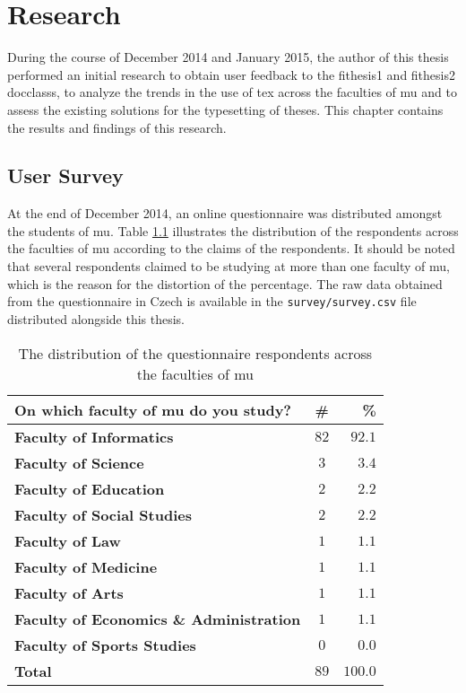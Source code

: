 \chapter{Research}
During the course of December 2014 and January 2015, the author of this thesis performed an initial research to obtain user feedback to the fithesis1 and fithesis2 \glspl{docclass}, to analyze the trends in the use of \gls{tex} across the faculties of \gls{mu} and to assess the existing solutions for the typesetting of theses. This chapter contains the results and findings of this research.

  \section{User Survey}
  At the end of December 2014, an online questionnaire was distributed amongst the students of \gls{mu}. Table \ref{table:survey-faculty} illustrates the distribution of the respondents across the faculties of \gls{mu} according to the claims of the respondents. It should be noted that several respondents claimed to be studying at more than one faculty of \gls{mu}, which is the reason for the distortion of the percentage. The raw data obtained from the questionnaire in Czech is available in the \texttt{survey/survey.csv} file distributed alongside this thesis.

  \begin{table}
    \caption{The distribution of the questionnaire respondents across the faculties of \acrshort{mu}}
    \begin{tabularx}{\textwidth}{Xcr}
      \textbf{On which faculty of \gls{mu} do you study?} & \textbf{\#} & \textbf{\%} \\
      \hline
      \textbf{Faculty of Informatics}                  & $82$          & $92.1$ \\
      \textbf{Faculty of Science}                      &  $3$          &  $3.4$ \\
      \textbf{Faculty of Education}                    &  $2$          &  $2.2$ \\
      \textbf{Faculty of Social Studies}               &  $2$          &  $2.2$ \\
      \textbf{Faculty of Law}                          &  $1$          &  $1.1$ \\
      \textbf{Faculty of Medicine}                     &  $1$          &  $1.1$ \\
      \textbf{Faculty of Arts}                         &  $1$          &  $1.1$ \\
      \textbf{Faculty of Economics \& Administration}  &  $1$          &  $1.1$ \\
      \textbf{Faculty of Sports Studies}               &  $0$          &  $0.0$ \\
      \hline
      \textbf{Total}                        & \textbf{$89$} & \textbf{$100.0$}
    \end{tabularx}
    \label{table:survey-faculty}
  \end{table}


